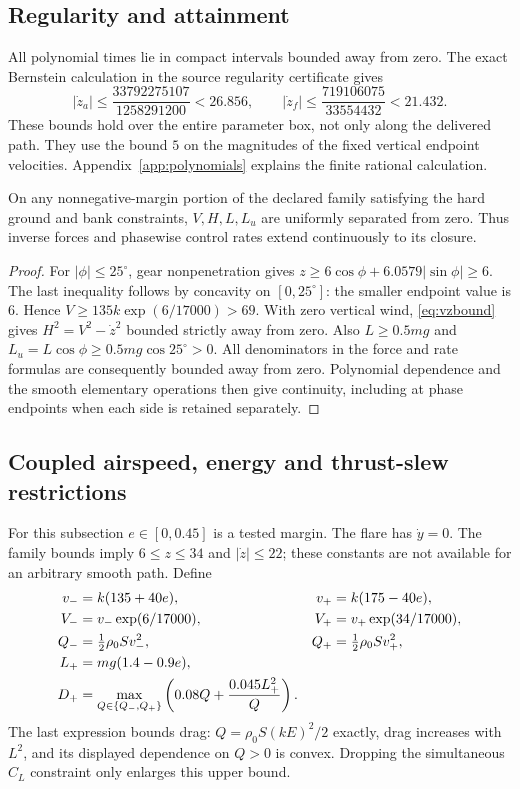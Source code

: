 \subsection{Regularity and attainment}\label{sec:compactness}
All polynomial times lie in compact intervals bounded away from zero. The exact Bernstein calculation in the source regularity certificate gives
\begin{equation}\label{eq:vzbound}
 |\dot z_a|\leq\frac{33792275107}{1258291200}<26.856,
 \qquad |\dot z_f|\leq\frac{719106075}{33554432}<21.432.
\end{equation}
These bounds hold over the entire parameter box, not only along the delivered path. They use the bound $5$ on the magnitudes of the fixed vertical endpoint velocities. Appendix~\ref{app:polynomials} explains the finite rational calculation.

\begin{lemma}\label{lem:regular}
On any nonnegative-margin portion of the declared family satisfying the hard ground and bank constraints, $V,H,L,L_u$ are uniformly separated from zero. Thus inverse forces and phasewise control rates extend continuously to its closure.
\end{lemma}
\begin{proof}
For $|\phi|\leq25^\circ$, gear nonpenetration gives $z\geq6\cos\phi+6.0579|\sin\phi|\geq6$. The last inequality follows by concavity on $[0,25^\circ]$: the smaller endpoint value is $6$. Hence $V\geq135k \exp(6/17000)>69$. With zero vertical wind, \eqref{eq:vzbound} gives $H^2=V^2-\dot z^2$ bounded strictly away from zero. Also $L\geq0.5mg$ and $L_u=L\cos\phi\geq0.5mg\cos25^\circ>0$. All denominators in the force and rate formulas are consequently bounded away from zero. Polynomial dependence and the smooth elementary operations then give continuity, including at phase endpoints when each side is retained separately.
\end{proof}



\subsection{Coupled airspeed, energy and thrust-slew restrictions}
For this subsection $e\in[0,0.45]$ is a tested margin. The flare has $\dot y=0$. The family bounds imply $6\leq z\leq34$ and $|\dot z|\leq22$; these constants are not available for an arbitrary smooth path. Define
\begin{align}\label{eq:energyconstants}
 v_-&=k(135+40e),& v_+&=k(175-40e),\notag\\
 V_-&=v_-\exp(6/17000),&V_+&=v_+\exp(34/17000),\notag\\
 Q_-&=\tfrac12\rho_0 S v_-^2,&Q_+&=\tfrac12\rho_0 S v_+^2,\notag\\
 L_+&=mg(1.4-0.9e),&&\notag\\
 D_+&=\max_{Q\in\{Q_-,Q_+\}}\left(0.08Q+\frac{0.045L_+^2}{Q}\right).
\end{align}
The last expression bounds drag: $Q=\rho_0 S(kE)^2/2$ exactly, drag increases with $L^2$, and its displayed dependence on $Q>0$ is convex. Dropping the simultaneous $C_L$ constraint only enlarges this upper bound.

